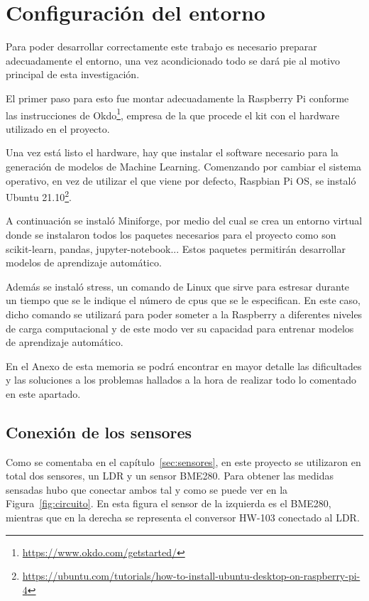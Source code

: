 \documentclass[a4paper, 12pt]{book}
\begin{document}
\section{Configuración del entorno}

Para poder desarrollar correctamente este trabajo es necesario preparar adecuadamente el entorno, una vez acondicionado todo se dará pie al motivo principal de esta investigación.

El primer paso para esto fue montar adecuadamente la Raspberry Pi conforme las instrucciones de Okdo\footnote{\url{https://www.okdo.com/getstarted/}}, empresa de la que procede el kit con el hardware utilizado en el proyecto.

Una vez está listo el hardware, hay que instalar el software necesario para la generación de modelos de Machine Learning.
Comenzando por cambiar el sistema operativo, en vez de utilizar el que viene por defecto, Raspbian Pi OS, se instaló Ubuntu 21.10\footnote{\url{https://ubuntu.com/tutorials/how-to-install-ubuntu-desktop-on-raspberry-pi-4}}.

A continuación se instaló Miniforge, por medio del cual se crea un entorno virtual donde se instalaron todos los paquetes necesarios para el proyecto como son scikit-learn, pandas, jupyter-notebook... Estos paquetes permitirán desarrollar modelos de aprendizaje automático.

Además se instaló stress, un comando de Linux que sirve para estresar durante un tiempo que se le indique el número de cpus que se le especifican. En este caso, dicho comando se utilizará para poder someter a la Raspberry a diferentes niveles de carga computacional y de este modo ver su capacidad para entrenar modelos de aprendizaje automático. 

En el Anexo de esta memoria se podrá encontrar en mayor detalle las dificultades y las soluciones a los problemas hallados a la hora de realizar todo lo comentado en este apartado.


\subsection{Conexión de los sensores}
\label{subsec:conexion_sensores}

Como se comentaba en el capítulo~\ref{sec:sensores}, en este proyecto se utilizaron en total dos sensores, un LDR y un sensor BME280. Para obtener las medidas sensadas hubo que conectar ambos tal y como se puede ver en la Figura~\ref{fig:circuito}. En esta figura el sensor de la izquierda es el BME280, mientras que en la derecha se representa el conversor HW-103 conectado al LDR.
\end{document}
